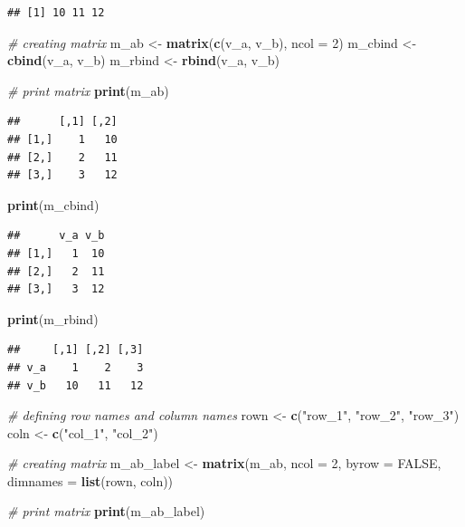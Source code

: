 \documentclass[
  12pt,
  oneside]{book}
\newenvironment{Shaded}{\begin{snugshade}}{\end{snugshade}}
\newcommand{\AttributeTok}[1]{\textcolor[rgb]{0.13,0.29,0.53}{#1}}
\newcommand{\CommentTok}[1]{\textcolor[rgb]{0.56,0.35,0.01}{\textit{#1}}}
\newcommand{\ConstantTok}[1]{\textcolor[rgb]{0.56,0.35,0.01}{#1}}
\newcommand{\DecValTok}[1]{\textcolor[rgb]{0.00,0.00,0.81}{#1}}
\newcommand{\FunctionTok}[1]{\textcolor[rgb]{0.13,0.29,0.53}{\textbf{#1}}}
\newcommand{\NormalTok}[1]{#1}
\newcommand{\OtherTok}[1]{\textcolor[rgb]{0.56,0.35,0.01}{#1}}
\newcommand{\StringTok}[1]{\textcolor[rgb]{0.31,0.60,0.02}{#1}}
\begin{document}
\begin{verbatim}
## [1] 10 11 12
\end{verbatim}

\begin{Shaded}
\begin{Highlighting}[]
\CommentTok{\# creating matrix}
\NormalTok{m\_ab }\OtherTok{\textless{}{-}} \FunctionTok{matrix}\NormalTok{(}\FunctionTok{c}\NormalTok{(v\_a, v\_b), }\AttributeTok{ncol =} \DecValTok{2}\NormalTok{)}
\NormalTok{m\_cbind }\OtherTok{\textless{}{-}} \FunctionTok{cbind}\NormalTok{(v\_a, v\_b)}
\NormalTok{m\_rbind }\OtherTok{\textless{}{-}} \FunctionTok{rbind}\NormalTok{(v\_a, v\_b)}

\CommentTok{\# print matrix}
\FunctionTok{print}\NormalTok{(m\_ab)}
\end{Highlighting}
\end{Shaded}

\begin{verbatim}
##      [,1] [,2]
## [1,]    1   10
## [2,]    2   11
## [3,]    3   12
\end{verbatim}

\begin{Shaded}
\begin{Highlighting}[]
\FunctionTok{print}\NormalTok{(m\_cbind)}
\end{Highlighting}
\end{Shaded}

\begin{verbatim}
##      v_a v_b
## [1,]   1  10
## [2,]   2  11
## [3,]   3  12
\end{verbatim}

\begin{Shaded}
\begin{Highlighting}[]
\FunctionTok{print}\NormalTok{(m\_rbind)}
\end{Highlighting}
\end{Shaded}

\begin{verbatim}
##     [,1] [,2] [,3]
## v_a    1    2    3
## v_b   10   11   12
\end{verbatim}

\begin{Shaded}
\begin{Highlighting}[]
\CommentTok{\# defining row names and column names}
\NormalTok{rown }\OtherTok{\textless{}{-}} \FunctionTok{c}\NormalTok{(}\StringTok{"row\_1"}\NormalTok{, }\StringTok{"row\_2"}\NormalTok{, }\StringTok{"row\_3"}\NormalTok{)}
\NormalTok{coln }\OtherTok{\textless{}{-}} \FunctionTok{c}\NormalTok{(}\StringTok{"col\_1"}\NormalTok{, }\StringTok{"col\_2"}\NormalTok{)}

\CommentTok{\# creating matrix}
\NormalTok{m\_ab\_label }\OtherTok{\textless{}{-}} \FunctionTok{matrix}\NormalTok{(m\_ab, }\AttributeTok{ncol =} \DecValTok{2}\NormalTok{, }\AttributeTok{byrow =} \ConstantTok{FALSE}\NormalTok{, }
            \AttributeTok{dimnames =} \FunctionTok{list}\NormalTok{(rown, coln))}
  
\CommentTok{\# print matrix}
\FunctionTok{print}\NormalTok{(m\_ab\_label)}
\end{Highlighting}
\end{Shaded}
\end{document}
